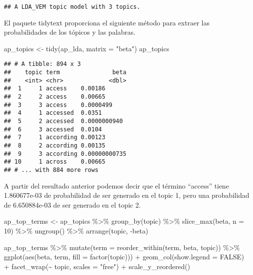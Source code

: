 \documentclass[
]{book}
\newenvironment{Shaded}{\begin{snugshade}}{\end{snugshade}}
\newcommand{\AttributeTok}[1]{\textcolor[rgb]{0.77,0.63,0.00}{#1}}
\newcommand{\ConstantTok}[1]{\textcolor[rgb]{0.00,0.00,0.00}{#1}}
\newcommand{\DecValTok}[1]{\textcolor[rgb]{0.00,0.00,0.81}{#1}}
\newcommand{\FunctionTok}[1]{\textcolor[rgb]{0.00,0.00,0.00}{#1}}
\newcommand{\NormalTok}[1]{#1}
\newcommand{\OtherTok}[1]{\textcolor[rgb]{0.56,0.35,0.01}{#1}}
\newcommand{\SpecialCharTok}[1]{\textcolor[rgb]{0.00,0.00,0.00}{#1}}
\newcommand{\StringTok}[1]{\textcolor[rgb]{0.31,0.60,0.02}{#1}}
\begin{document}
\begin{verbatim}
## A LDA_VEM topic model with 3 topics.
\end{verbatim}

El paquete tidytext proporciona el siguiente método para extraer las probabilidades de los tópicos y las palabras.

\begin{Shaded}
\begin{Highlighting}[]
\NormalTok{ap\_topics }\OtherTok{\textless{}{-}} \FunctionTok{tidy}\NormalTok{(ap\_lda, }\AttributeTok{matrix =} \StringTok{"beta"}\NormalTok{)}
\NormalTok{ap\_topics}
\end{Highlighting}
\end{Shaded}

\begin{verbatim}
## # A tibble: 894 x 3
##    topic term               beta
##    <int> <chr>             <dbl>
##  1     1 access    0.00186      
##  2     2 access    0.00665      
##  3     3 access    0.0000499    
##  4     1 accessed  0.0351       
##  5     2 accessed  0.0000000940 
##  6     3 accessed  0.0104       
##  7     1 according 0.00123      
##  8     2 according 0.00135      
##  9     3 according 0.00000000735
## 10     1 across    0.00665      
## # ... with 884 more rows
\end{verbatim}

A partir del resultado anterior podemos decir que el término ``access'' tiene 1.860677e-03 de probabilidad de ser generado en el topic 1, pero una probabilidad de 6.650884e-03 de ser generado en el topic 2.

\begin{Shaded}
\begin{Highlighting}[]
\NormalTok{ap\_top\_terms }\OtherTok{\textless{}{-}}\NormalTok{ ap\_topics }\SpecialCharTok{\%\textgreater{}\%}
  \FunctionTok{group\_by}\NormalTok{(topic) }\SpecialCharTok{\%\textgreater{}\%}
  \FunctionTok{slice\_max}\NormalTok{(beta, }\AttributeTok{n =} \DecValTok{10}\NormalTok{) }\SpecialCharTok{\%\textgreater{}\%} 
  \FunctionTok{ungroup}\NormalTok{() }\SpecialCharTok{\%\textgreater{}\%}
  \FunctionTok{arrange}\NormalTok{(topic, }\SpecialCharTok{{-}}\NormalTok{beta)}

\NormalTok{ap\_top\_terms }\SpecialCharTok{\%\textgreater{}\%}
  \FunctionTok{mutate}\NormalTok{(}\AttributeTok{term =} \FunctionTok{reorder\_within}\NormalTok{(term, beta, topic)) }\SpecialCharTok{\%\textgreater{}\%}
  \FunctionTok{ggplot}\NormalTok{(}\FunctionTok{aes}\NormalTok{(beta, term, }\AttributeTok{fill =} \FunctionTok{factor}\NormalTok{(topic))) }\SpecialCharTok{+}
  \FunctionTok{geom\_col}\NormalTok{(}\AttributeTok{show.legend =} \ConstantTok{FALSE}\NormalTok{) }\SpecialCharTok{+}
  \FunctionTok{facet\_wrap}\NormalTok{(}\SpecialCharTok{\textasciitilde{}}\NormalTok{ topic, }\AttributeTok{scales =} \StringTok{"free"}\NormalTok{) }\SpecialCharTok{+}
  \FunctionTok{scale\_y\_reordered}\NormalTok{()}
\end{Highlighting}
\end{Shaded}
\end{document}
